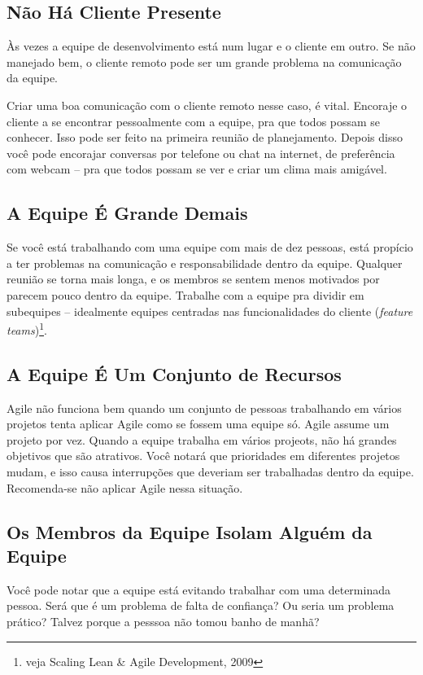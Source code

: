 \documentclass[a4paper, 10pt, font=plain]{abnt}
\begin{document}
\subsection{Não Há Cliente Presente}
Às vezes a equipe de desenvolvimento está num lugar e o cliente em outro. Se não manejado bem, o cliente remoto pode ser um grande problema na comunicação da equipe.

Criar uma boa comunicação com o cliente remoto nesse caso, é vital. Encoraje o cliente a se encontrar pessoalmente com a equipe, pra que todos possam se conhecer. Isso pode ser feito na primeira reunião de planejamento. Depois disso você pode encorajar conversas por telefone ou chat na internet, de preferência com webcam -- pra que todos possam se ver e criar um clima mais amigável.


\subsection{A Equipe É Grande Demais}
Se você está trabalhando com uma equipe com mais de dez pessoas, está propício a ter problemas na comunicação e responsabilidade dentro da equipe. Qualquer reunião se torna mais longa, e os membros se sentem menos motivados por parecem pouco dentro da equipe. Trabalhe com a equipe pra dividir em subequipes -- idealmente equipes centradas nas funcionalidades do cliente (\textit{feature teams})\footnote{veja Scaling Lean \& Agile Development, 2009}.


\subsection{A Equipe É Um Conjunto de Recursos}
Agile não funciona bem quando um conjunto de pessoas trabalhando em vários projetos tenta aplicar Agile como se fossem uma equipe só. Agile assume um projeto por vez. Quando a equipe trabalha em vários projeots, não há grandes objetivos que são atrativos. Você notará que prioridades em diferentes projetos mudam, e isso causa interrupções que deveriam ser trabalhadas dentro da equipe. Recomenda-se não aplicar Agile nessa situação.



\subsection{Os Membros da Equipe Isolam Alguém da Equipe}
Você pode notar que a equipe está evitando trabalhar com uma determinada pessoa. Será que é um problema de falta de confiança? Ou seria um problema prático? Talvez porque a pesssoa não tomou banho de manhã?
\end{document}
